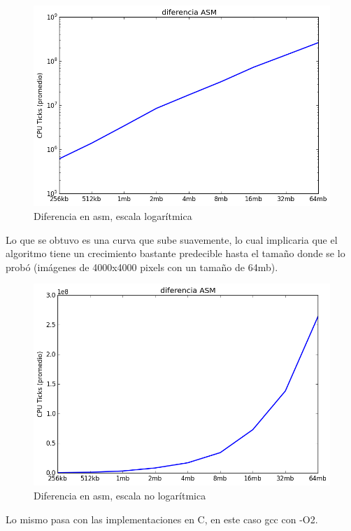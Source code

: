 \documentclass[a4paper]{article}
\begin{document}
\begin{figure}[h]
	\centerline{\includegraphics[scale=0.60]{imagenes/test_performance_size_ASM.png}}
	\caption{Diferencia en asm, escala logarítmica}
\end{figure}

 Lo que se obtuvo es una curva que sube suavemente, lo cual implicaria que el algoritmo tiene un crecimiento bastante predecible hasta el tamaño donde se lo probó (imágenes de 4000x4000 pixels con un tamaño de 64mb).

\begin{figure}[h]
	\centerline{\includegraphics[scale=0.60]{imagenes/test_performance_size_ASM_not_log.png}}
	\caption{Diferencia en asm, escala no logarítmica}
\end{figure}

\newpage 

Lo mismo pasa con las implementaciones en C, en este caso gcc con -O2.
\end{document}
